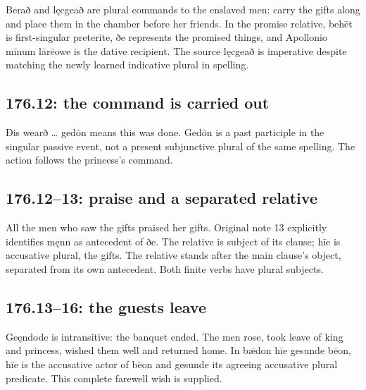 Berað and lęcgeað are plural commands to the enslaved men: carry the gifts along and place them in the chamber before her friends. In the promise relative, behēt is first-singular preterite, ðe represents the promised things, and Apollonio mīnum lārēowe is the dative recipient. The source lęcgeað is imperative despite matching the newly learned indicative plural in spelling.

\subsection*{176.12: the command is carried out}

Ðis wearð … gedōn means this was done. Gedōn is a past participle in the singular passive event, not a present subjunctive plural of the same spelling. The action follows the princess’s command.

\subsection*{176.12–13: praise and a separated relative}

All the men who saw the gifts praised her gifts. Original note 13 explicitly identifies męnn as antecedent of ðe. The relative is subject of its clause; hīe is accusative plural, the gifts. The relative stands after the main clause’s object, separated from its own antecedent. Both finite verbs have plural subjects.

\subsection*{176.13–16: the guests leave}

Geęndode is intransitive: the banquet ended. The men rose, took leave of king and princess, wished them well and returned home. In bǣdon hīe gesunde bēon, hīe is the accusative actor of bēon and gesunde its agreeing accusative plural predicate. This complete farewell wish is supplied.

